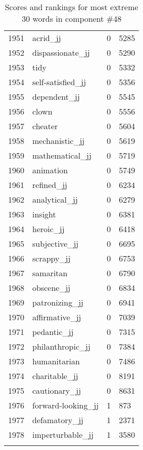 \begin{longtable}[!htbp]{| rlr@{.}l |}
    1951 & acrid\_jj & 0 & 5285 \\
    1952 & dispassionate\_jj & 0 & 5290 \\
    1953 & tidy & 0 & 5332 \\
    1954 & self-satisfied\_jj & 0 & 5356 \\
    1955 & dependent\_jj & 0 & 5545 \\
    1956 & clown & 0 & 5556 \\
    1957 & cheater & 0 & 5604 \\
    1958 & mechanistic\_jj & 0 & 5619 \\
    1959 & mathematical\_jj & 0 & 5719 \\
    1960 & animation & 0 & 5749 \\
    1961 & refined\_jj & 0 & 6234 \\
    1962 & analytical\_jj & 0 & 6279 \\
    1963 & insight & 0 & 6381 \\
    1964 & heroic\_jj & 0 & 6418 \\
    1965 & subjective\_jj & 0 & 6695 \\
    1966 & scrappy\_jj & 0 & 6753 \\
    1967 & samaritan & 0 & 6790 \\
    1968 & obscene\_jj & 0 & 6834 \\
    1969 & patronizing\_jj & 0 & 6941 \\
    1970 & affirmative\_jj & 0 & 7039 \\
    1971 & pedantic\_jj & 0 & 7315 \\
    1972 & philanthropic\_jj & 0 & 7384 \\
    1973 & humanitarian & 0 & 7486 \\
    1974 & charitable\_jj & 0 & 8191 \\
    1975 & cautionary\_jj & 0 & 8631 \\
    1976 & forward-looking\_jj & 1 & 873 \\
    1977 & defamatory\_jj & 1 & 2371 \\
    1978 & imperturbable\_jj & 1 & 3580 \\
    \hline
    \caption{Scores and rankings for most extreme 30 words in component \#48} \\
\end{longtable}
